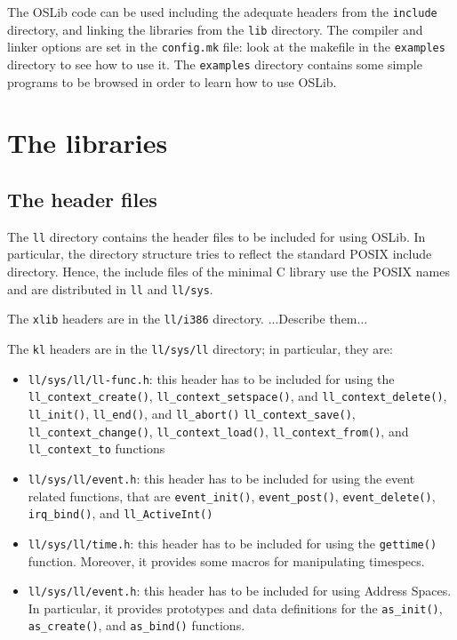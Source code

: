 \documentclass[a4paper]{report}
\begin{document}
The OSLib code can be used including the adequate headers
from the {\tt include} directory, and linking the libraries from the
{\tt lib} directory. The compiler and linker options are set in the
{\tt config.mk} file: look at the makefile in the {\tt examples} directory
to see how to use it. The {\tt examples} directory contains
some simple programs to be browsed in order to learn how to use OSLib.

\chapter{The libraries}
\section{The header files}
The {\tt ll} directory contains the header files to be included for
using OSLib. In particular, the directory structure tries to reflect the
standard POSIX include directory. Hence, the include files of the minimal
C library use the POSIX names and are distributed in {\tt ll} and
{\tt ll/sys}.

The {\tt xlib} headers are in the {\tt ll/i386} directory.
...Describe them...

The {\tt kl} headers are in the {\tt ll/sys/ll} directory; in particular,
they are:
\begin{itemize}
	\item {\tt ll/sys/ll/ll-func.h}: this header has to be included for
		using the {\tt ll\_context\_create()},
		{\tt ll\_context\_setspace()}, and {\tt ll\_context\_delete()},
		{\tt ll\_init()}, {\tt ll\_end()}, and {\tt ll\_abort()}
		{\tt ll\_context\_save()}, {\tt ll\_context\_change()},
		{\tt ll\_context\_load()}, {\tt ll\_context\_from()}, and
		{\tt ll\_context\_to} functions
	\item {\tt ll/sys/ll/event.h}: this header has to be included for
		using the event related functions, that are 
		{\tt event\_init()}, {\tt event\_post()},
		{\tt event\_delete()}, {\tt irq\_bind()}, and
		{\tt ll\_ActiveInt()}
	\item {\tt ll/sys/ll/time.h}: this header has to be included for
		using the {\tt gettime()} function. Moreover, it provides
		some macros for manipulating timespecs.
	\item {\tt ll/sys/ll/event.h}: this header has to be included for
		using Address Spaces. In particular, it provides prototypes
		and data definitions for the {\tt as\_init()},
		{\tt as\_create()}, and {\tt as\_bind()} functions.
\end{itemize}
\end{document}
